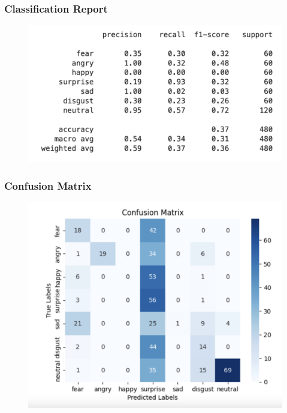 \documentclass[a4paper,12pt]{article}
\begin{document}
\subsubsection{Classification Report}
\begin{figure}[H]
    \centering
    \includegraphics[width=1\linewidth]{5414.png}
\end{figure}
\subsubsection{Confusion Matrix}
\begin{figure}[H]
    \centering
    \includegraphics[width=1\linewidth]{5415.png}
\end{figure}
\newpage
\end{document}
